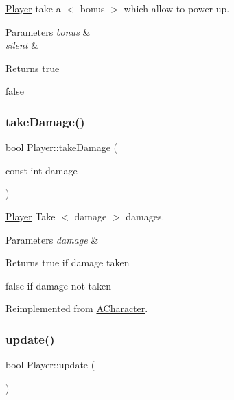\hyperlink{class_player}{Player} take a $<$ bonus $>$ which allow to power up. 


\begin{DoxyParams}{Parameters}
{\em bonus} & \\
\hline
{\em silent} & \\
\hline
\end{DoxyParams}
\begin{DoxyReturn}{Returns}
true 

false 
\end{DoxyReturn}
\mbox{\label{class_player_a029b1d511340697d8ccfb7bfa604435b}} 
\subsubsection{\texorpdfstring{take\+Damage()}{takeDamage()}}
{\footnotesize\ttfamily bool Player\+::take\+Damage (\begin{DoxyParamCaption}\item[{const int}]{damage }\end{DoxyParamCaption})\hspace{0.3cm}{\ttfamily [virtual]}}



\hyperlink{class_player}{Player} Take $<$ damage $>$ damages. 


\begin{DoxyParams}{Parameters}
{\em damage} & \\
\hline
\end{DoxyParams}
\begin{DoxyReturn}{Returns}
true if damage taken 

false if damage not taken 
\end{DoxyReturn}


Reimplemented from \hyperlink{class_a_character_a1ab94580e4db621f79f0bf1d6bcdb600}{A\+Character}.

\mbox{\label{class_player_a1614c89caa50fa1527417ba6a2bbe6ee}} 
\subsubsection{\texorpdfstring{update()}{update()}}
{\footnotesize\ttfamily bool Player\+::update (\begin{DoxyParamCaption}{ }\end{DoxyParamCaption})\hspace{0.3cm}{\ttfamily [virtual]}}



